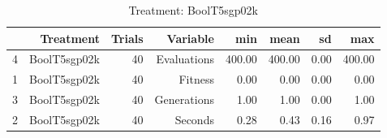 \begin{table}[ht]
\centering
\begin{tabular}{rrrrrrrr}
  \hline
 & Treatment & Trials & Variable & min & mean & sd & max \\ 
  \hline
4 & BoolT5sgp02k &  40 & Evaluations & 400.00 & 400.00 & 0.00 & 400.00 \\ 
  1 & BoolT5sgp02k &  40 & Fitness & 0.00 & 0.00 & 0.00 & 0.00 \\ 
  3 & BoolT5sgp02k &  40 & Generations & 1.00 & 1.00 & 0.00 & 1.00 \\ 
  2 & BoolT5sgp02k &  40 & Seconds & 0.28 & 0.43 & 0.16 & 0.97 \\ 
   \hline
\end{tabular}
\caption{Treatment: BoolT5sgp02k} 
\end{table}
